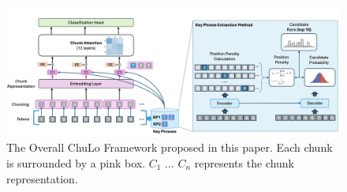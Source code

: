 \documentclass[11pt]{article}
\begin{document}
\begin{figure}[th]
\vspace{-0.1in}
\includegraphics[width=1.0\linewidth]{images/framework_2.png}
\vspace{-0.1in}
\caption{The Overall ChuLo Framework proposed in this paper. Each chunk is surrounded by a pink box. $C_1$ ... $C_n$ represents the chunk representation.}
\label{fig:framework}
\vspace{-5mm}
\end{figure}
\end{document}
